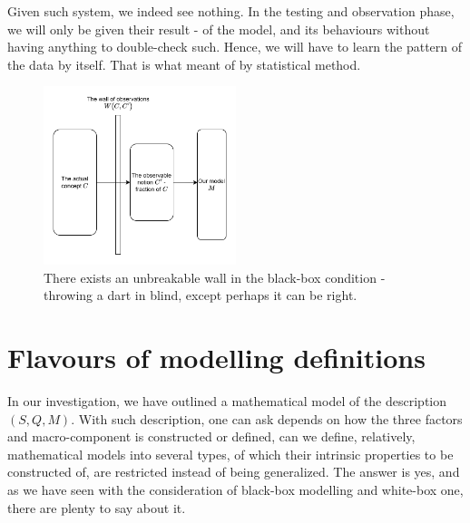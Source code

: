 Given such system, we indeed see nothing. In the testing and observation phase, we will only be given their result - of the model, and its behaviours without having anything to double-check such. Hence, we will have to learn the pattern of the data by itself. That is what meant of by statistical method. 

\begin{figure}[h!]
    \centering
    \includegraphics[width=0.5\textwidth]{img/blackboxstatistics.png}
    \caption{There exists an unbreakable wall in the black-box condition - throwing a dart in blind, except perhaps it can be right.}
\end{figure}

\section{Flavours of modelling definitions}\label{sec:flavor_model}

In our investigation, we have outlined a mathematical model of the description $(S,Q,M)$. With such description, one can ask depends on how the three factors and macro-component is constructed or defined, can we define, relatively, mathematical models into several types, of which their intrinsic properties to be constructed of, are restricted instead of being generalized. The answer is yes, and as we have seen with the consideration of black-box modelling and white-box one, there are plenty to say about it. 

